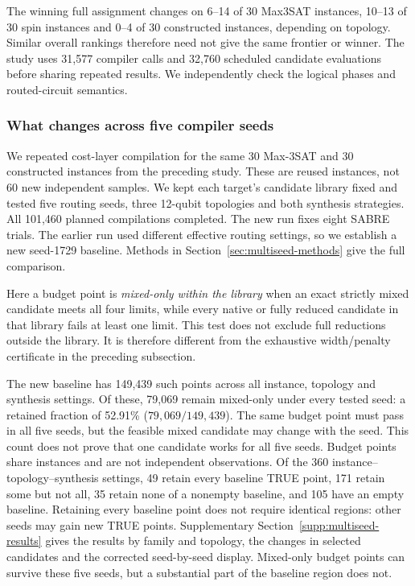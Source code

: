 \documentclass[a4paper,onecolumn,11pt,unpublished]{quantumarticle}
\theoremstyle{remark}
\begin{document}
The winning full assignment changes on 6--14 of 30 Max3SAT instances,
10--13 of 30 spin instances and 0--4 of 30 constructed instances,
depending on topology. Similar overall rankings therefore need not give
the same frontier or winner.
The study uses 31,577 compiler calls and 32,760 scheduled candidate
evaluations before sharing repeated results. We independently check the
logical phases and routed-circuit semantics.


\subsubsection{What changes across five compiler seeds}
\label{sec:multiseed-robustness}
We repeated cost-layer compilation for the same 30 Max-3SAT and 30
constructed instances from the preceding study. These are reused
instances, not 60 new independent samples. We kept each target's candidate
library fixed and tested five routing seeds, three 12-qubit topologies and
both synthesis strategies. All 101,460 planned compilations completed.
The new run fixes eight SABRE trials. The earlier run used different
effective routing settings, so we establish a new seed-1729 baseline.
Methods in Section~\ref{sec:multiseed-methods} give the full comparison.

Here a budget point is \emph{mixed-only within the library} when an exact
strictly mixed candidate meets all four limits, while every native or
fully reduced candidate in that library fails at least one limit.
This test does not exclude full reductions outside the library.
It is therefore different from the exhaustive width/penalty certificate
in the preceding subsection.

The new baseline has 149,439 such points across all instance, topology and
synthesis settings. Of these, 79,069 remain mixed-only under every tested
seed: a retained fraction of 52.91\% ($79{,}069/149{,}439$).
The same budget point must pass in all five seeds, but the feasible mixed
candidate may change with the seed. This count does not prove that one
candidate works for all five seeds. Budget points share instances and are
not independent observations.
Of the 360 instance--topology--synthesis settings, 49 retain every
baseline TRUE point, 171 retain some but not all, 35 retain none of a
nonempty baseline, and 105 have an empty baseline. Retaining every
baseline point does not require identical regions: other seeds may gain
new TRUE points. Supplementary Section~\ref{supp:multiseed-results} gives the results by
family and topology, the changes in selected candidates and the corrected
seed-by-seed display. Mixed-only budget points can survive these five
seeds, but a substantial part of the baseline region does not.
\end{document}
